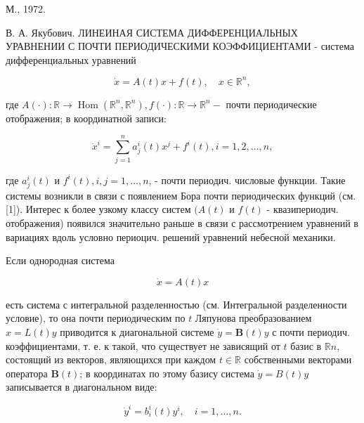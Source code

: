 \documentclass[10pt]{article}
\begin{document}
М., 1972.

В. А. Якубович. ЛИНЕИНАЯ СИСТЕМА ДИФФЕРЕНЦИАЛЬНЫХ УРАВНЕНИИ С ПОЧТИ ПЕРИОДИЧЕСКИМИ КОЭФФИЦИЕНТАМИ - система дифференциальных уравнений



\[

\dot{x}=A(t) x+f(t), \quad x \in \mathbb{R}^{n},

\]



где $A(\cdot): \mathbb{R} \rightarrow \operatorname{Hom}\left(\mathbb{R}^{n}, \mathbb{R}^{n}\right), f(\cdot): \mathbb{R} \rightarrow \mathbb{R}^{n}-$ почти периодические отображения; в координатной записи:



\[

\dot{x}^{i}=\sum_{j=1}^{n} a_{j}^{i}(t) x^{j}+f^{i}(t), i=1,2, \ldots, n,

\]



где $a_{j}^{i}(t)$ и $f^{i}(t), i, j=1, \ldots, n$, - почти периодич. числовые функции. Такие системы возникли в связи с появлением Бора почти периодических функций (см. [1]). Интерес к более узкому классу систем $(A(t)$ и $f(t)$ - квазипериодич. отображения) появился значительно раньше в связи с рассмотрением уравнений в вариациях вдоль условно периоцич. решений уравнений небесной механики.



Если однородная система



\[

\dot{x}=A(t) x

\]



есть система с интегральной разделенностью (см. Интегральной разделенности условие), то она почти периодическим по $t$ Ляпунова преобразованием $x=L(t) y$ приводится к диагональной системе $\dot{y}=\boldsymbol{B}(t) y$ с почти периодич. коэффициентами, т. е. к такой, что существует не зависящий от $t$ базис в $\mathbb{R} n$, состоящий из векторов, являющихся при каждом $t \in \mathbb{R}$ собственными векторами оператора $\boldsymbol{B}(t)$; в координатах по этому базису система $\dot{y}=B(t) y$ записывается в диагональном виде:



\[

\dot{y}^{i}=b_{i}^{i}(t) y^{i}, \quad i=1, \ldots, n .

\]
\end{document}

